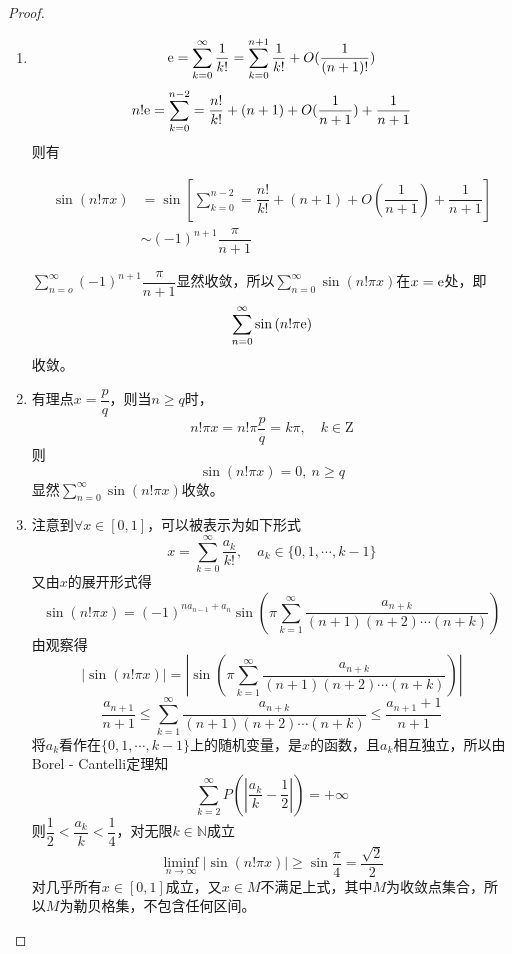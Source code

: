 \begin{proof}

    \begin{enumerate}

        \item 
            $$\mathrm{e} = \sum_{k=0}^{\infty}{\dfrac{1}{k!}} = \sum_{k=0}^{n+1}{\dfrac{1}{k!}} + O(\dfrac{1}{(n+1)!})$$
            $$n! \mathrm{e} = \sum_{k=0}^{n-2} = \dfrac{n!}{k!} + (n+1) + O(\dfrac{1}{n + 1}) + \dfrac{1}{n + 1}$$
            则有

            \begin{align*}
                \sin{(n!\pi x)} & = \sin{\left[\sum\limits_{k=0}^{n-2} = \dfrac{n!}{k!} + (n+1) + O(\dfrac{1}{n + 1}) + \dfrac{1}{n + 1}\right]} \\
                & \sim (-1)^{n+1} \dfrac{\pi}{n+1}
            \end{align*}
            
            $\sum\limits_{n=o}^{\infty}{(-1)^{n+1} \dfrac{\pi}{n+1}}$显然收敛，所以$\sum\limits_{n=0}^{\infty}{\sin{(n!\pi x)}}$在$x= \mathrm{e}$处，即
            $$\sum\limits_{n=0}^{\infty}{\sin{(n!\pi \mathrm{e})}}$$
            收敛。
        
        \item 
            有理点$x = \dfrac{p}{q}$，则当$n \geq q$时，
            $$n!\pi x = n! \pi \dfrac{p}{q} = k\pi,\quad k \in \mathrm{Z}$$
            则
            $$\sin{(n!\pi x)} = 0, \ n \geq q$$
            显然$\sum\limits_{n=0}^{\infty}{\sin{(n!\pi x)}}$收敛。

        \item 注意到$\forall x \in [0,1]$，可以被表示为如下形式
            $$x = \sum_{k=0}^{\infty}{\dfrac{a_k}{k!}}, \quad a_k \in \{0, 1, \cdots, k-1\}$$
            又由$x$的展开形式得
            $$\sin{(n!\pi x)} = (-1)^{na_{n-1} + a_n} \sin{\left(\pi \sum\limits_{k=1}^{\infty}{\dfrac{a_{n+k}}{(n+1)(n+2) \cdots(n+k)}}\right)}$$
            由观察得
            $$ |\sin{(n!\pi x)}| = \left| \sin{\left(\pi \sum\limits_{k=1}^{\infty}{\dfrac{a_{n+k}}{(n+1)(n+2) \cdots(n+k)}}\right)} \right|$$
            $$\dfrac{a_{n+1}}{n+1} \leq \sum_{k=1}^{\infty}{\dfrac{a_{n+k}}{(n+1)(n+2) \cdots (n+k)}} \leq \dfrac{a_{n+1} + 1}{n+1} $$
            将$a_k$看作在$\{0, 1, \cdots, k-1\}$上的随机变量，是$x$的函数，且$a_k$相互独立，所以由\textup{Borel - Cantelli}定理知
            $$\sum_{k=2}^{\infty}{P \left(\left| \dfrac{a_k}{k} - \dfrac{1}{2} \right| \right)} = +\infty$$
            则$\dfrac{1}{2} < \dfrac{a_k}{k} < \dfrac{1}{4}$，对无限$k \in \mathbb{N}$成立
            $$\liminf_{n\to\infty}{|\sin(n!\pi x)|} \geq \sin{\dfrac{\pi}{4}} = \dfrac{\sqrt{2}}{2}$$
            对几乎所有$x \in [0,1]$成立，又$x \in M$不满足上式，其中$M$为收敛点集合，所以$M$为勒贝格集，不包含任何区间。

       \end{enumerate}

\end{proof}

